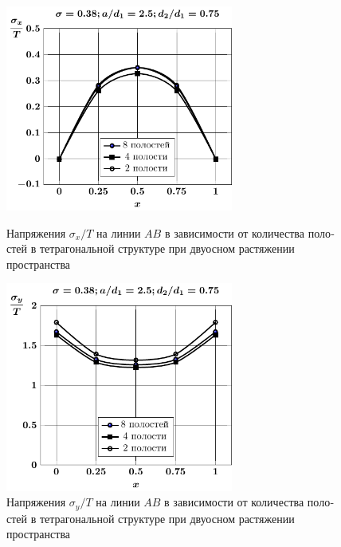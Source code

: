 \begin{russian}


\begin{figure}[h!]
\centering\footnotesize
\parbox[b]{7.5cm}{\centering\includegraphics[width=7.5cm]{cav8-4-2-sig_x-spheroids-tension2.pdf}
\caption{Напряжения $\sigma_x/T$ на линии $AB$ в зависимости от количества полостей в тетрагональной структуре при двуосном растяжении пространства
\label{f:9:11}}}\hfil\hfil
\parbox[b]{7.5cm}{\centering\includegraphics[width=7.5cm]{cav8-4-2-sig_y-spheroids-tension2.pdf}
\caption{Напряжения $\sigma_y/T$ на линии $AB$ в зависимости от количества полостей в тетрагональной структуре при двуосном растяжении пространства
\label{f:9:12}}}
\end{figure}


\end{russian}
